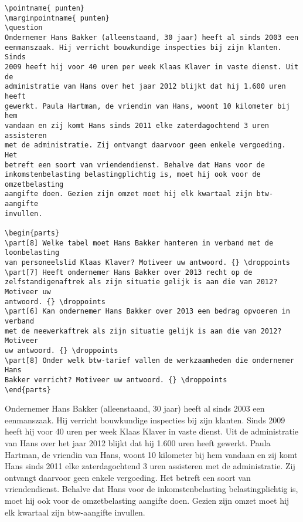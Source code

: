 \documentclass[dutch,a4paper,12pt,addpoints,fleqn,oneside]{tisdexam}
\begin{document}
\begin{questions}
\begin{lstlisting}
\pointname{ punten}
\marginpointname{ punten}
\question
Ondernemer Hans Bakker (alleenstaand, 30 jaar) heeft al sinds 2003 een
eenmanszaak. Hij verricht bouwkundige inspecties bij zijn klanten. Sinds
2009 heeft hij voor 40 uren per week Klaas Klaver in vaste dienst. Uit de
administratie van Hans over het jaar 2012 blijkt dat hij 1.600 uren heeft
gewerkt. Paula Hartman, de vriendin van Hans, woont 10 kilometer bij hem
vandaan en zij komt Hans sinds 2011 elke zaterdagochtend 3 uren assisteren
met de administratie. Zij ontvangt daarvoor geen enkele vergoeding. Het
betreft een soort van vriendendienst. Behalve dat Hans voor de
inkomstenbelasting belastingplichtig is, moet hij ook voor de omzetbelasting
aangifte doen. Gezien zijn omzet moet hij elk kwartaal zijn btw-aangifte
invullen.

\begin{parts}
\part[8] Welke tabel moet Hans Bakker hanteren in verband met de loonbelasting
van personeelslid Klaas Klaver? Motiveer uw antwoord. {} \droppoints
\part[7] Heeft ondernemer Hans Bakker over 2013 recht op de
zelfstandigenaftrek als zijn situatie gelijk is aan die van 2012? Motiveer uw
antwoord. {} \droppoints
\part[6] Kan ondernemer Hans Bakker over 2013 een bedrag opvoeren in verband
met de meewerkaftrek als zijn situatie gelijk is aan die van 2012? Motiveer
uw antwoord. {} \droppoints
\part[8] Onder welk btw-tarief vallen de werkzaamheden die ondernemer Hans
Bakker verricht? Motiveer uw antwoord. {} \droppoints
\end{parts}
\end{lstlisting}

\question
Ondernemer Hans Bakker (alleenstaand, 30 jaar) heeft al sinds 2003 een
eenmanszaak. Hij verricht bouwkundige inspecties bij zijn klanten. Sinds
2009 heeft hij voor 40 uren per week Klaas Klaver in vaste dienst. Uit de
administratie van Hans over het jaar 2012 blijkt dat hij 1.600 uren heeft
gewerkt. Paula Hartman, de vriendin van Hans, woont 10 kilometer bij hem
vandaan en zij komt Hans sinds 2011 elke zaterdagochtend 3 uren assisteren
met de administratie. Zij ontvangt daarvoor geen enkele vergoeding. Het
betreft een soort van vriendendienst. Behalve dat Hans voor de
inkomstenbelasting belastingplichtig is, moet hij ook voor de omzetbelasting
aangifte doen. Gezien zijn omzet moet hij elk kwartaal zijn btw-aangifte
invullen.


\end{questions}
\end{document}
